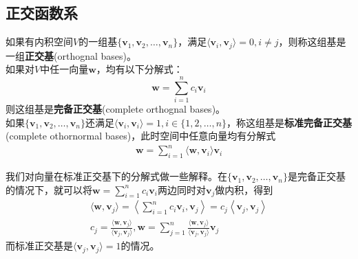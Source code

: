 \documentclass{ctexbook}
\begin{document}
\subsection{正交函数系}\label{sub:orthognal}
\begin{definition}[正交基]
    如果有内积空间$V$的一组基$\{\mathbf{v}_1,\mathbf{v}_2,\dots ,\mathbf{v}_n\}$，满足$\langle \mathbf{v}_i,\mathbf{v}_j\rangle =0,i \neq j$，则称这组基是一组\textbf{正交基}(orthognal bases)。\\如果对$V$中任一向量$\mathbf{w}$，均有以下分解式：
    \[\mathbf{w}=\sum_{i = 1}^{n}  c_i \mathbf{v}_i\]
则这组基是\textbf{完备正交基}(complete orthognal bases)。\\
如果$\{\mathbf{v}_1,\mathbf{v}_2,\dots ,\mathbf{v}_n\}$还满足$\langle \mathbf{v}_i,\mathbf{v}_i\rangle =1,i\in \{1,2,\dots ,n\}$，称这组基是\textbf{标准完备正交基} (complete othornormal bases)，此时空间中任意向量均有分解式
\begin{align*}
    \mathbf{w}=\sum_{i=1}^{n}\langle \mathbf{w},\mathbf{v}_i\rangle \mathbf{v}_i
\end{align*}
\end{definition}
我们对向量在标准正交基下的分解式做一些解释。在$\{\mathbf{v}_1,\mathbf{v}_2,\dots ,\mathbf{v}_n\}$是完备正交基的情况下，就可以将$\mathbf{w}=\sum_{i = 1}^{n}  c_i \mathbf{v}_i$两边同时对$\mathbf{v}_j$做内积，得到
\begin{align*}
    \langle \mathbf{w},\mathbf{v}_j \rangle=\left\langle \sum_{i = 1}^{n}  c_i \mathbf{v}_i,\mathbf{v}_j \right\rangle =c_j\left\langle \mathbf{v}_j,\mathbf{v}_j \right\rangle \\
    c_j=\frac{\langle \mathbf{w},\mathbf{v}_j \rangle}{\langle \mathbf{v}_j,\mathbf{v}_j \rangle},
    \mathbf{w}=\sum_{j = 1}^{n}  \frac{\langle \mathbf{w},\mathbf{v}_j \rangle}{\langle \mathbf{v}_j,\mathbf{v}_j \rangle} \mathbf{v}_j
\end{align*}
而标准正交基是$\langle \mathbf{v}_j,\mathbf{v}_j \rangle=1$的情况。
\end{document}

